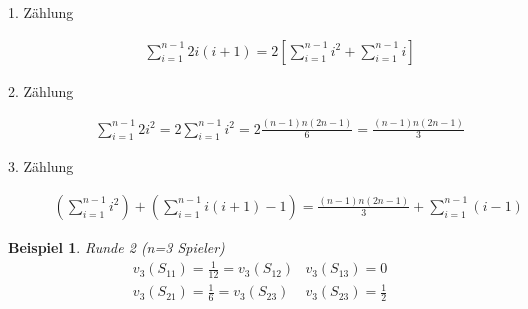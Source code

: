 \documentclass[a4paper,10pt]{scrartcl}
\newtheorem*{beispiel*}{Beispiel}
\begin{document}
\begin{description}
 \item[1. Zählung]\begin{align*}
                   \sum\limits_{i=1}^{n-1}2i(i+1)=2\left[\sum\limits_{i=1}^{n-1}i^2+\sum\limits_{i=1}^{n-1}i\right]
                  \end{align*}
 \item[2. Zählung]\begin{align*}
                   \sum\limits_{i=1}^{n-1}2i^2=2\sum\limits_{i=1}^{n-1}i^2=2\frac{(n-1)n(2n-1)}{6}=\frac{(n-1)n(2n-1)}{3}
                  \end{align*}
 \item[3. Zählung]\begin{align*}
                   \left(\sum\limits_{i=1}^{n-1}i^2\right)+\left(\sum\limits_{i=1}^{n-1}i(i+1)-1\right)=
                   \frac{(n-1)n(2n-1)}{3}+\sum\limits_{i=1}^{n-1}(i-1)
                  \end{align*}
\end{description}
\begin{beispiel*}
 Runde 2 (n=3 Spieler)
 \begin{eqnarray*}
  v_3(S_{11})=\frac{1}{12}=v_3(S_{12}) & v_3(S_{13})=0\\
  v_3(S_{21})=\frac{1}{6}=v_3(S_{23}) & v_3(S_{23})=\frac{1}{2}
 \end{eqnarray*}
\end{beispiel*}
\end{document}
